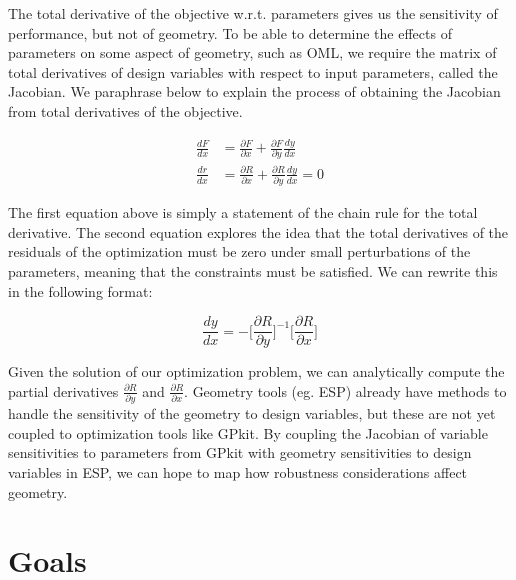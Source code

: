 \documentclass[journal]{new-aiaa}
\begin{document}
The total derivative of the objective w.r.t. parameters gives us the sensitivity of performance,
but not of geometry. To be able to determine the effects of parameters on some aspect of geometry,
such as OML, we require the matrix of total derivatives of design variables with respect to input parameters,
called the Jacobian. We paraphrase \cite{Martins2013} below to explain
the process of obtaining the Jacobian from total derivatives of the objective. 

\begin{equation}
\begin{split}
\frac{dF}{dx} &= \frac{\partial F}{\partial x} + \frac{\partial F}{\partial y} \frac{dy}{dx}  \\ 
\frac{dr}{dx} &= \frac{\partial R}{\partial x} + \frac{\partial R}{\partial y} \frac{dy}{dx} = 0
\end{split}
\end{equation}

The first equation above is simply a statement of the chain rule for 
the total derivative. The second equation
explores the idea that the total derivatives of the residuals of the optimization must be zero under small
perturbations of the parameters, meaning that the constraints must be satisfied.
We can rewrite this in the following format:

\begin{equation}
\frac{dy}{dx} = - \Big[\frac{\partial R}{\partial y} \Big]^{-1} \Big[ \frac{\partial R}{\partial x} \Big] 
\end{equation}

Given the solution of
our optimization problem, we can analytically compute the partial derivatives $\frac{\partial R}{\partial y}$
and $\frac{\partial R}{\partial x}$.
Geometry tools (eg. ESP) already have methods to handle the sensitivity of the geometry to design variables,
but these are not yet coupled to optimization tools like GPkit. By coupling the Jacobian of variable sensitivities
to parameters from GPkit with geometry sensitivities to design variables in ESP, we can hope to map how
robustness considerations affect geometry. 

\section{Goals}
\end{document}
